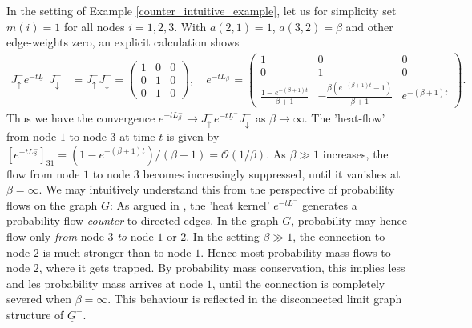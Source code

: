 \documentclass[reqno,12pt,letterpaper]{amsart}
\numberwithin{equation}{section}
\newcommand{\Lin}{L^{-}}
\newcommand{\1}{\mathds{1}}
\theoremstyle{definition}
\begin{document}
	\noindent	In the setting of Example \ref{counter_intuitive_example}, let us for simplicity set $m(i) = 1$ for all nodes $i = 1,2,3$. With $a(2,1) =1$, $a(3,2) = \beta$ and other edge-weights zero, an explicit calculation shows
		\begin{align}\label{explicit_rep}
	J^-_\uparrow e^{-t\underline{L}^-} J^-_\downarrow &= J^-_\uparrow J^-_\downarrow = \begin{pmatrix}
	1 & 0 & 0 \\
	0 & 1 & 0 \\
	0 & 1 & 0
\end{pmatrix},
\quad	
e^{-t \Lin_\beta}
=
\begin{pmatrix}
	1 & 0 & 0 \\
	0 & 1 & 0 \\
	\frac{1 - e^{-(\beta + 1)t}}{\beta + 1} & -\frac{\beta (e^{-(\beta + 1)t} - 1)}{\beta + 1} & e^{-(\beta + 1)t}
\end{pmatrix}.
		\end{align}
Thus we have the convergence $e^{-t\Lin_\beta} \rightarrow J^-_\uparrow  e^{-t\underline{L}^-} J^-_\downarrow$ as $\beta \rightarrow \infty$.
 The 'heat-flow' from node $1$ to node $3$ at time $t$ is given by $[e^{-t\Lin_\beta}]_{31} = 	(1 - e^{-(\beta + 1)t})/(\beta + 1) = \mathcal{O}(1/\beta)$. As $\beta \gg 1$ increases, the flow from node $1$ to node $3$ becomes increasingly suppressed, until it vanishes at $\beta = \infty$. 
We may intuitively understand this from the perspective of probability flows on the graph $G$: As argued in  \cite[Section 6]{Veerman2020APO}, the 'heat kernel' $e^{-t\Lin}$ generates a probability flow \emph{counter} to directed edges. In the graph $G$, probability may hence flow only \emph{from} node $3$ \emph{to} node $1$ or $2$. In the setting $\beta \gg 1$, the connection to node $2$ is much stronger than to node $1$. Hence most probability mass flows to node $2$, where it gets trapped. By probability mass conservation, this implies less and les probability mass arrives at node $1$, until the connection is completely severed when $\beta = \infty$. This behaviour is reflected in the disconnected  limit graph structure of $\underline{G}^-$.
\end{document}
